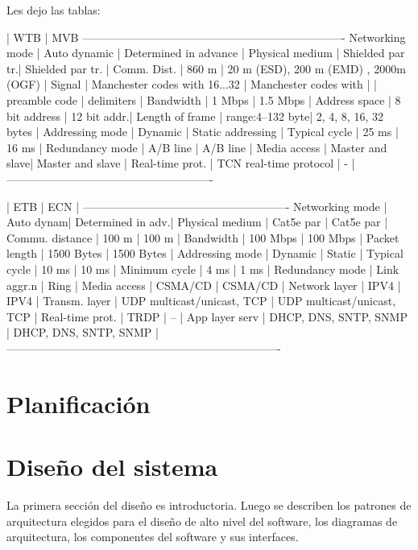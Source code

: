 \documentclass[
11pt, %
]{charter}
\begin{document}
Les dejo las tablas:

| WTB | MVB
----------------------------------------------------------------------
Networking mode | Auto  dynamic | Determined in advance |
Physical medium | Shielded par tr.| Shielded par tr. |
Comm. Dist. | 860 m | 20 m (ESD), 200 m (EMD) , 2000m (OGF) |
Signal | Manchester codes with 16...32 | Manchester codes with |
| preamble code | delimiters |
Bandwidth | 1 Mbps | 1.5 Mbps |
Address space | 8 bit address | 12 bit addr.|
Length of frame | range:4–132 byte| 2, 4, 8, 16, 32 bytes |
Addressing mode | Dynamic | Static addressing |
Typical cycle | 25 ms | 16 ms |
Redundancy mode | A/B line | A/B line |
Media access | Master and slave| Master and slave |
Real-time prot. | TCN real-time protocol | - |
-------------------------------------------------------

| ETB | ECN |
-------------------------------------------------------
Networking mode | Auto  dynam| Determined in adv.|
Physical medium | Cat5e par   | Cat5e par  |
Commu. distance | 100 m | 100 m  |
Bandwidth | 100 Mbps | 100 Mbps  |
Packet length | 1500 Bytes | 1500 Bytes  |
Addressing mode | Dynamic | Static  |
Typical cycle | 10 ms | 10 ms |
Minimum cycle | 4 ms | 1 ms |
Redundancy mode | Link aggr.n | Ring |
Media access | CSMA/CD | CSMA/CD |
Network layer | IPV4 | IPV4 |
Transm. layer | UDP multicast/unicast, TCP | UDP multicast/unicast, TCP |
Real-time prot. | TRDP | – |
App layer serv | DHCP, DNS, SNTP, SNMP | DHCP, DNS, SNTP, SNMP |
-------------------------------------------------------------------------

\pagebreak

\section{Planificación}

\pagebreak

\section{Diseño del sistema}
La primera sección del diseño es introductoria. Luego se describen los patrones de arquitectura elegidos para el diseño de alto nivel del software, los diagramas de arquitectura, los componentes del software y sus interfaces.
\end{document}
